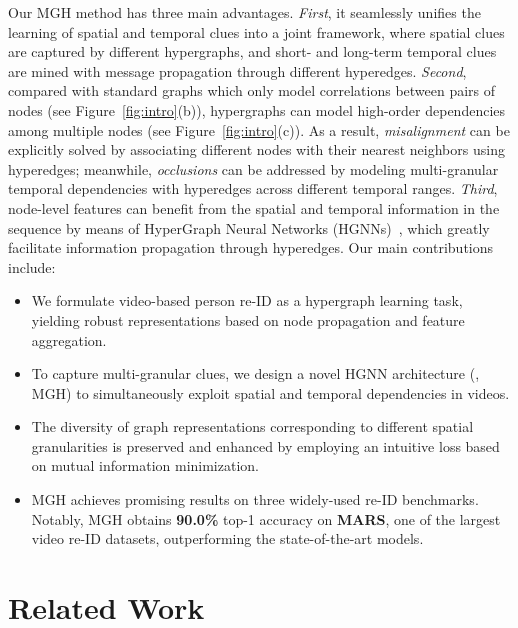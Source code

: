 \documentclass[10pt,twocolumn,letterpaper]{article}
\begin{document}
Our MGH method has three main advantages. \emph{First}, it seamlessly unifies the learning of spatial and temporal clues into a joint framework, where spatial clues are captured by different hypergraphs, and short- and long-term temporal clues are mined with message propagation through different hyperedges. \emph{Second}, compared with standard graphs which only model correlations between pairs of nodes (see Figure~\ref{fig:intro}(b)), hypergraphs can model high-order dependencies among multiple nodes (see Figure~\ref{fig:intro}(c)). As a result, \emph{misalignment} can be explicitly solved by associating different nodes with their nearest neighbors using hyperedges; meanwhile, \emph{occlusions} can be addressed by modeling multi-granular temporal dependencies with hyperedges across different temporal ranges. \emph{Third}, node-level features can benefit from the spatial and temporal information in the sequence by means of HyperGraph Neural Networks (HGNNs)~\cite{DBLP:conf/aaai/FengYZJG19}, which greatly facilitate information propagation through hyperedges. 
Our main contributions include:
\begin{itemize}
\setlength{\abovedisplayskip}{0pt}
\setlength{\itemsep}{0pt}
\item We formulate video-based person re-ID as a hypergraph learning task, yielding robust representations based on node propagation and feature aggregation.
\item To capture multi-granular clues, we design a novel HGNN architecture (\ie, MGH) to simultaneously exploit spatial and temporal dependencies in videos.
\item The diversity of graph representations corresponding to different spatial granularities is preserved and enhanced by employing an intuitive loss based on mutual information minimization.
\item MGH achieves promising results on three widely-used re-ID benchmarks. Notably, MGH obtains \textbf{90.0\%} top-1 accuracy on \textbf{MARS}, one of the largest video re-ID datasets, outperforming the state-of-the-art models.
\end{itemize}


\section{Related Work}
\end{document}

